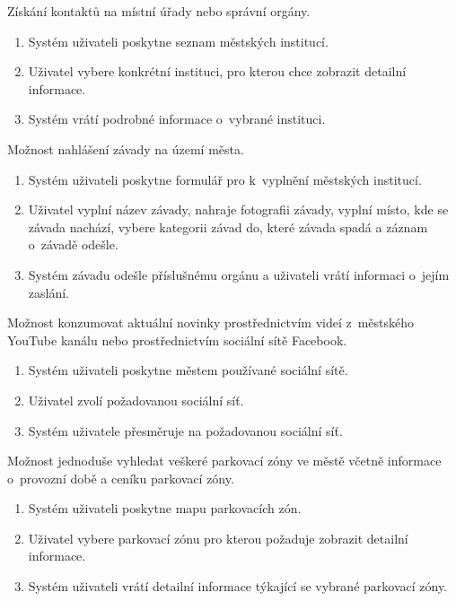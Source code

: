 Získání kontaktů na místní úřady nebo správní orgány. 

\begin{enumerate}
  \item Systém uživateli poskytne seznam městských institucí.
  \item Uživatel vybere konkrétní instituci, pro kterou chce zobrazit detailní informace.
  \item Systém vrátí podrobné informace o~vybrané instituci.  
\end{enumerate}

Možnost nahlášení závady na území města.

\begin{enumerate}
  \item Systém uživateli poskytne formulář pro k~vyplnění městských institucí.
  \item Uživatel vyplní název závady, nahraje fotografii závady, vyplní místo, kde se závada nachází, vybere kategorii závad do, které závada spadá a 
  záznam o~závadě odešle.
  \item Systém závadu odešle příslušnému orgánu a uživateli vrátí informaci o~jejím zaslání.
  
\end{enumerate}

Možnost konzumovat aktuální novinky prostřednictvím videí z~městského YouTube kanálu nebo prostřednictvím sociální sítě Facebook.

\begin{enumerate}
  \item Systém uživateli poskytne městem používané sociální sítě.
  \item Uživatel zvolí požadovanou sociální síť.
  \item Systém uživatele přesměruje na požadovanou sociální síť.
\end{enumerate}

Možnost jednoduše vyhledat veškeré parkovací zóny ve městě včetně informace o~provozní době a ceníku parkovací zóny.

\begin{enumerate}
  \item Systém uživateli poskytne mapu parkovacích zón.
  \item Uživatel vybere parkovací zónu pro kterou požaduje zobrazit detailní informace.
  \item Systém uživateli vrátí detailní informace týkající se vybrané parkovací zóny.
\end{enumerate}

